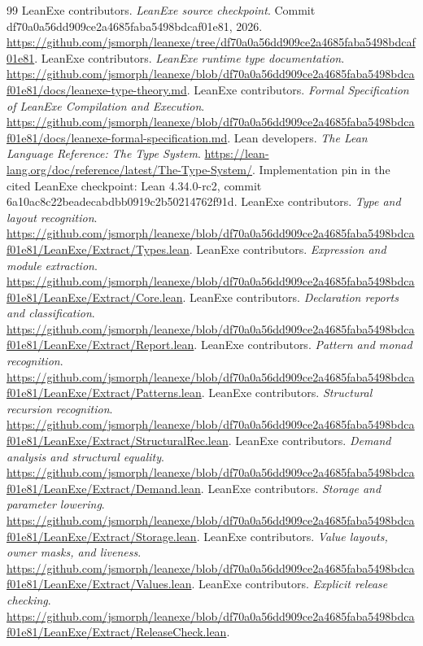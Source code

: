 \documentclass[11pt]{article}
\begin{document}
\begin{thebibliography}{99}
\small
{} LeanExe contributors. \emph{LeanExe source checkpoint}. Commit df70a0a56dd909ce2a4685faba5498bdcaf01e81, 2026. \url{https://github.com/jsmorph/leanexe/tree/df70a0a56dd909ce2a4685faba5498bdcaf01e81}.
 LeanExe contributors. \emph{LeanExe runtime type documentation}. \url{https://github.com/jsmorph/leanexe/blob/df70a0a56dd909ce2a4685faba5498bdcaf01e81/docs/leanexe-type-theory.md}.
 LeanExe contributors. \emph{Formal Specification of LeanExe Compilation and Execution}. \url{https://github.com/jsmorph/leanexe/blob/df70a0a56dd909ce2a4685faba5498bdcaf01e81/docs/leanexe-formal-specification.md}.
 Lean developers. \emph{The Lean Language Reference: The Type System}. \url{https://lean-lang.org/doc/reference/latest/The-Type-System/}. Implementation pin in the cited LeanExe checkpoint: Lean 4.34.0-rc2, commit 6a10ac8c22beadecabdbb0919c2b50214762f91d.
 LeanExe contributors. \emph{Type and layout recognition}. \url{https://github.com/jsmorph/leanexe/blob/df70a0a56dd909ce2a4685faba5498bdcaf01e81/LeanExe/Extract/Types.lean}.
 LeanExe contributors. \emph{Expression and module extraction}. \url{https://github.com/jsmorph/leanexe/blob/df70a0a56dd909ce2a4685faba5498bdcaf01e81/LeanExe/Extract/Core.lean}.
 LeanExe contributors. \emph{Declaration reports and classification}. \url{https://github.com/jsmorph/leanexe/blob/df70a0a56dd909ce2a4685faba5498bdcaf01e81/LeanExe/Extract/Report.lean}.
 LeanExe contributors. \emph{Pattern and monad recognition}. \url{https://github.com/jsmorph/leanexe/blob/df70a0a56dd909ce2a4685faba5498bdcaf01e81/LeanExe/Extract/Patterns.lean}.
 LeanExe contributors. \emph{Structural recursion recognition}. \url{https://github.com/jsmorph/leanexe/blob/df70a0a56dd909ce2a4685faba5498bdcaf01e81/LeanExe/Extract/StructuralRec.lean}.
 LeanExe contributors. \emph{Demand analysis and structural equality}. \url{https://github.com/jsmorph/leanexe/blob/df70a0a56dd909ce2a4685faba5498bdcaf01e81/LeanExe/Extract/Demand.lean}.
 LeanExe contributors. \emph{Storage and parameter lowering}. \url{https://github.com/jsmorph/leanexe/blob/df70a0a56dd909ce2a4685faba5498bdcaf01e81/LeanExe/Extract/Storage.lean}.
 LeanExe contributors. \emph{Value layouts, owner masks, and liveness}. \url{https://github.com/jsmorph/leanexe/blob/df70a0a56dd909ce2a4685faba5498bdcaf01e81/LeanExe/Extract/Values.lean}.
 LeanExe contributors. \emph{Explicit release checking}. \url{https://github.com/jsmorph/leanexe/blob/df70a0a56dd909ce2a4685faba5498bdcaf01e81/LeanExe/Extract/ReleaseCheck.lean}.

\end{thebibliography}
\end{document}
